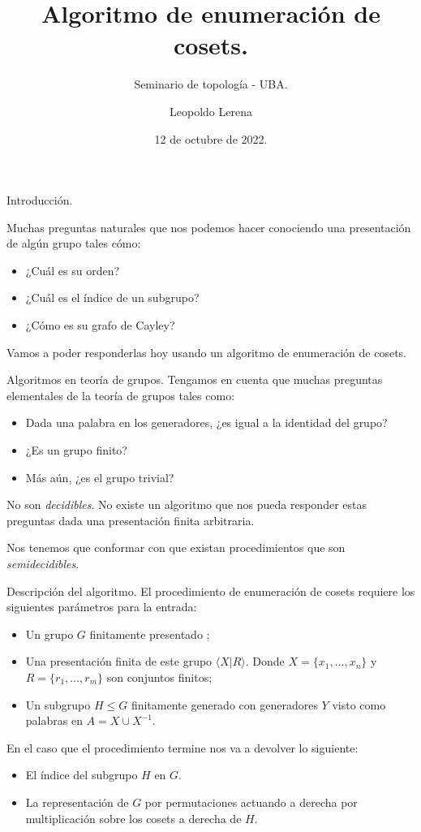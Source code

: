 \documentclass[aspectratio=169, 9pt]{beamer}
\title{Algoritmo de enumeración de cosets.}
\subtitle{Seminario de topología - UBA.}
\date{12 de octubre de 2022.}
\author{Leopoldo Lerena}
\institute{Universidad de Buenos Aires}
\newcommand{\fg}{finitamente generado }
\newcommand{\fp}{finitamente presentado }
\begin{document}
\maketitle

\begin{frame}[fragile]{Introducción.}


Muchas preguntas naturales que nos podemos hacer conociendo una presentación de algún grupo tales cómo:

\begin{itemize}
	\item ¿Cuál es su orden?
	\pause
	\item ¿Cuál es 	el índice de un subgrupo?
	\pause
	\item ¿Cómo es su grafo de Cayley?
	\pause
\end{itemize}

Vamos a poder responderlas hoy usando un algoritmo de enumeración de cosets.
\end{frame}

\begin{frame}[fragile]{Algoritmos en teoría de grupos.}
	Tengamos en cuenta que muchas preguntas elementales de la teoría de grupos tales como:
	\begin{itemize}
		\item Dada una palabra en los generadores, ¿es igual a la identidad del grupo?
		\pause
		\item ¿Es un grupo finito?
		\pause
		\item Más aún, ¿es el grupo trivial?
	\end{itemize}
	\pause
	No son \textit{decidibles}. 
	No existe un algoritmo que nos pueda responder estas preguntas dada una presentación finita arbitraria.
	\medskip
	
	\pause
	
	
	Nos tenemos que conformar con que existan procedimientos que son \textit{semidecidibles}. 
\end{frame}

\begin{frame}[fragile]{Descripción del algoritmo.}
	El procedimiento de enumeración de cosets requiere los siguientes parámetros para la entrada:
	\begin{itemize}
		\item Un grupo $G$ \fp;
		\pause
		\item Una presentación finita de este grupo $\langle X | R \rangle$.
			Donde $X = \{ x_1, \dots, x_n \}$ y $R = \{ r_1, \dots, r_m \}$ son conjuntos finitos;
 		\pause
		\item Un subgrupo $H \le G$  \fg con generadores $Y$ visto como palabras en $A = X \cup X^{-1}$.
	\end{itemize}
	\pause
	\medskip
	
	En el caso que el procedimiento termine nos va a devolver lo siguiente:
	\pause
	\begin{itemize}
		\item El índice del subgrupo $H$ en $G$.
		\pause
		\item La representación de $G$ por permutaciones actuando a derecha por multiplicación sobre los cosets a derecha de $H$.
	\end{itemize}  
\end{frame}
\end{document}
